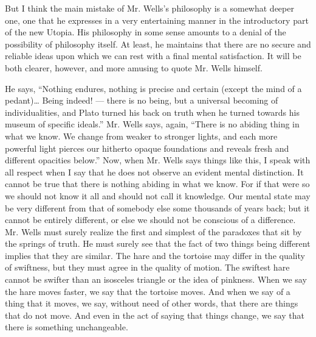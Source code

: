 But I think the main mistake of Mr. Wells’s philosophy is a somewhat deeper one, one that he expresses in a very entertaining manner in the introductory part of the new Utopia. His philosophy in some sense amounts to a denial of the possibility of philosophy itself. At least, he maintains that there are no secure and reliable ideas upon which we can rest with a final mental satisfaction. It will be both clearer, however, and more amusing to quote Mr. Wells himself.

He says, “Nothing endures, nothing is precise and certain (except the mind of a pedant)… Being indeed! — there is no being, but a universal becoming of individualities, and Plato turned his back on truth when he turned towards his museum of specific ideals.” Mr. Wells says, again, “There is no abiding thing in what we know. We change from weaker to stronger lights, and each more powerful light pierces our hitherto opaque foundations and reveals fresh and different opacities below.” Now, when Mr. Wells says things like this, I speak with all respect when I say that he does not observe an evident mental distinction. It cannot be true that there is nothing abiding in what we know. For if that were so we should not know it all and should not call it knowledge. Our mental state may be very different from that of somebody else some thousands of years back; but it cannot be entirely different, or else we should not be conscious of a difference. Mr. Wells must surely realize the first and simplest of the paradoxes that sit by the springs of truth. He must surely see that the fact of two things being different implies that they are similar. The hare and the tortoise may differ in the quality of swiftness, but they must agree in the quality of motion. The swiftest hare cannot be swifter than an isosceles triangle or the idea of pinkness. When we say the hare moves faster, we say that the tortoise moves. And when we say of a thing that it moves, we say, without need of other words, that there are things that do not move. And even in the act of saying that things change, we say that there is something unchangeable.

